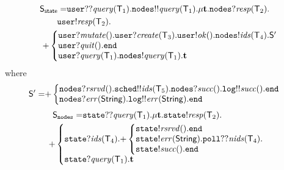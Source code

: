 \begin{align*}
	\ST_\mathsf{state} = &
	\mathtt{user}{??}\mathit{query}(\T_1).
	\mathtt{nodes}{!!}\mathit{query}(\T_1). %
	\mu \ty. 
	\mathtt{nodes}{?}\mathit{resp}(\T_2).\\
	& \hspace{-4mm} 
	\mathtt{user}{!}\mathit{resp}(\T_2).\\
	& \hspace{-10mm}
	{+}
	\left\{
	\begin{array}{@{}l@{}}
	\mathtt{user}{?}\mathit{mutate}().\mathtt{user}{?}\mathit{create}(\T_3).\mathtt{user}{!}\mathit{ok}().
	\mathtt{nodes}{!}\mathit{ids}(\T_4).\ST'\\
	\mathtt{user}{?}\mathit{quit}().\tend \\
	\mathtt{user}{?}\mathit{query}(\T_1).\mathtt{nodes}{!}\mathit{query}(\T_1).\ty
	\end{array} \right.
\end{align*}
where
\begin{align*}
	\ST' = &
	{+}
	\left\{
	\begin{array}{@{}l@{}}
	\mathtt{nodes}{?}\mathit{rsrvd}().\mathtt{sched}{!!}\mathit{ids}(\T_5).\mathtt{nodes}{?}\mathit{succ}().\mathtt{log}{!!}\mathit{succ}().\tend\\
	\mathtt{nodes}{?}\mathit{err}(\mathsf{String}).\mathtt{log}{!!}\mathit{err}(\mathsf{String}).\tend
	\end{array} \right.
\end{align*}
\begin{align*}
	\ST_\mathtt{nodes} =  &
	\mathtt{state}{??}\mathit{query}(\T_1).
	\mu \ty.
	\mathtt{state}{!}\mathit{resp}(\T_2).\\
	& \hspace{-14mm}
	{+}
	\left\{
	\begin{array}{@{}l@{}}
	\mathtt{state}{?}\mathit{ids}(\T_4).
	{+}\left\{
	\begin{array}{@{}l@{}}
	\mathtt{state}{!}\mathit{rsrvd}().\tend\\
	\mathtt{state}{!}\mathit{err}(\mathsf{String}).\mathtt{poll}{??}\mathit{nids}(\T_4).\\
	\mathtt{state}{!}\mathit{succ}().\tend
	\end{array} \right.	\\
	\mathtt{state}{?}\mathit{query}(\T_1).\ty
	\end{array} \right.
\end{align*}
